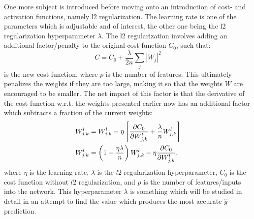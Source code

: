             One more subject is introduced before moving onto an introduction of cost- and activation functions, namely l2 regularization. The learning rate is one of the parameters which is adjustable and of interest, the other one being the l2 regularization hyperparameter $\lambda$. The l2 regularization involves adding an additional factor/penalty to the original cost function $C_0$, such that:
            \begin{equation}
                C = C_0 + \frac{\lambda}{2n} \sum_j |W_j|^2
            \end{equation}
            is the new cost function, where $p$ is the number of features. This ultimately penalizes the weights if they are too large, making it so that the weights $W$ are encouraged to be smaller. The net impact of this factor is that the derivative of the cost function w.r.t. the weights presented earlier now has an additional factor which subtracts a fraction of the current weights:
            \begin{align}
                W^l_{j,k} &= W^l_{j,k} - \eta\left[ \pdv{C_0}{W^l_{j,k}} + \frac{\lambda}{n} W^l_{j,k} \right]\\
                W^l_{j,k} &= \left(1-\frac{\eta\lambda}{n}\right)W^l_{j,k} - \eta \pdv{C_0}{W^l_{j,k}},
            \end{align}
            where $\eta$ is the learning rate, $\lambda$ is the $l2$ regularization hyperparameter, $C_0$ is the cost function without $l2$ regularization, and $p$ is the number of features/inputs into the network. This hyperparameter $\lambda$ is something which will be studied in detail in an attempt to find the value which produces the most accurate $\hat{y}$ prediction.%
            
